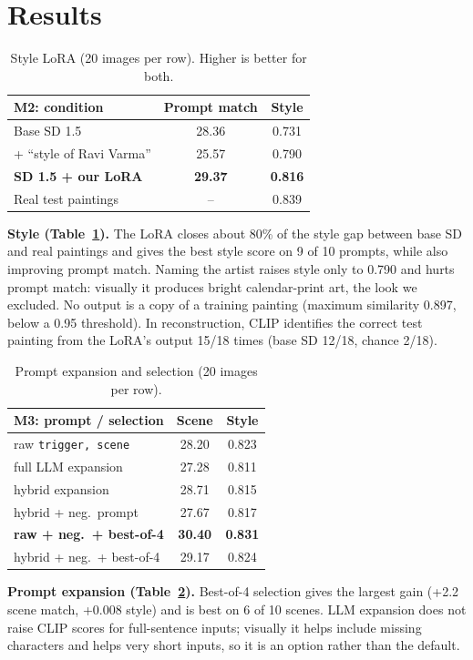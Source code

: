 \documentclass[11pt,a4paper,twocolumn]{article}
\begin{document}
\section{Results}
\begin{table}[h]
\centering
\small
\begin{tabular}{lcc}
\toprule
M2: condition & Prompt match & Style \\
\midrule
Base SD 1.5 & 28.36 & 0.731 \\
+ ``style of Ravi Varma'' & 25.57 & 0.790 \\
\textbf{SD 1.5 + our LoRA} & \textbf{29.37} & \textbf{0.816} \\
\midrule
Real test paintings & -- & 0.839 \\
\bottomrule
\end{tabular}
\caption{Style LoRA (20 images per row). Higher is better for both.}
\label{tab:m2}
\end{table}

\textbf{Style (Table~\ref{tab:m2}).} The LoRA closes about 80\% of the style gap between base SD and real
paintings and gives the best style score on 9 of 10 prompts, while also improving prompt match. Naming the
artist raises style only to 0.790 and hurts prompt match: visually it produces bright calendar-print art,
the look we excluded. No output is a copy of a training painting (maximum similarity 0.897, below a 0.95
threshold). In reconstruction, CLIP identifies the correct test painting from the LoRA's output 15/18 times
(base SD 12/18, chance 2/18).

\begin{table}[h]
\centering
\small
\begin{tabular}{lcc}
\toprule
M3: prompt / selection & Scene & Style \\
\midrule
raw \texttt{trigger, scene} & 28.20 & 0.823 \\
full LLM expansion & 27.28 & 0.811 \\
hybrid expansion & 28.71 & 0.815 \\
hybrid + neg.\ prompt & 27.67 & 0.817 \\
\textbf{raw + neg.\ + best-of-4} & \textbf{30.40} & \textbf{0.831} \\
hybrid + neg.\ + best-of-4 & 29.17 & 0.824 \\
\bottomrule
\end{tabular}
\caption{Prompt expansion and selection (20 images per row).}
\label{tab:m3}
\end{table}

\textbf{Prompt expansion (Table~\ref{tab:m3}).} Best-of-4 selection gives the largest gain (+2.2 scene match,
+0.008 style) and is best on 6 of 10 scenes. LLM expansion does not raise CLIP scores for full-sentence inputs;
visually it helps include missing characters and helps very short inputs, so it is an option rather than the
default.
\end{document}
